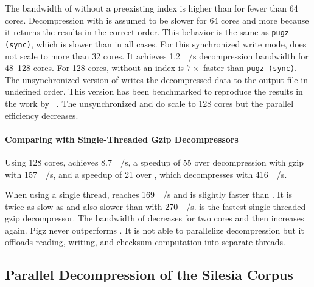 The bandwidth of \pragzip without a preexisting index is higher than \pugz for fewer than \num{64} cores.
Decompression with \pragzip is assumed to be slower for \num{64} cores and more because it returns the results in the correct order.
This behavior is the same as \texttt{pugz (sync)}, which is slower than \pragzip in all cases.
For this synchronized write mode, \pugz does not scale to more than 32 cores.
It achieves \SI{1.2}{\giga\byte/\second} decompression bandwidth for 48--128 cores.
For \num{128} cores, \pragzip without an index is $7\times$ faster than \texttt{pugz (sync)}.
The unsynchronized version of \pugz writes the decompressed data to the output file in undefined order.
This version has been benchmarked to reproduce the results in the work by \citeauthor{pugz}~\cite{pugz}.
The unsynchronized \pugz and \pragzip do scale to 128 cores but the parallel efficiency decreases.


\paragraph{Comparing \Pragzip with Single-Threaded Gzip Decompressors}

Using \num{128} cores, \pragzip achieves \SI{8.7}{\giga\byte/\second}, a speedup of \num{55} over decompression with gzip with \SI{157}{\mega\byte/\second}, and a speedup of \num{21} over , which decompresses with \SI{416}{\mega\byte/\second}.

When using a single thread, \pragzip reaches \SI{169}{\mega\byte/\second} and is slightly faster than .
It is twice as slow as  and also slower than \pigz with \SI{270}{\mega\byte/\second}.
 is the fastest single-threaded gzip decompressor.
The bandwidth of \pigz decreases for two cores and then increases again.
Pigz never outperforms .
It is not able to parallelize decompression but it offloads reading, writing, and checksum computation into separate threads.



\subsection{Parallel Decompression of the Silesia Corpus}

